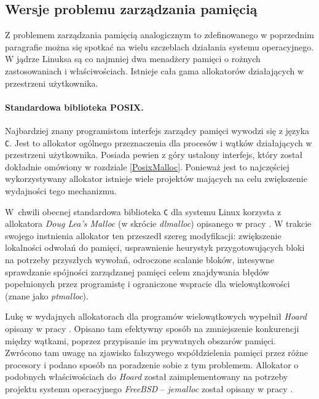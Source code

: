 \documentclass[12pt,a4paper,titlepage,twoside]{mwart}
\begin{document}
\subsection{Wersje problemu zarządzania pamięcią}

Z problemem zarządzania pamięcią analogicznym to zdefinowanego w poprzednim
paragrafie można się spotkać na wielu szczeblach działania systemu
operacyjnego. W jądrze Linuksa są co najmniej dwa menadżery pamięci o rożnych
zastosowaniach i właściwościach. Istnieje cała gama allokatorów działających w
przestrzeni użytkownika.

\paragraph{Standardowa biblioteka POSIX.}

Najbardziej znany programistom interfejs zarządcy pamięci wywodzi się z języka
\verb+C+. Jest to allokator ogólnego przeznaczenia dla procesów i wątków
działających w przestrzeni użytkownika. Posiada pewien z góry ustalony
interfejs, który został dokładnie omówiony w rozdziale \ref{PosixMalloc}.
Ponieważ jest to najczęściej wykorzystywany allokator istnieje wiele projektów
mających na celu zwiększenie wydajności tego mechanizmu.

W~chwili obecnej standardowa biblioteka \verb+C+ dla systemu Linux korzysta z
allokatora \textit{Doug Lea's Malloc} (w skrócie \textit{dlmalloc}) opisanego w
pracy \cite{douglea96malloc}. W trakcie swojego instnienia allokator ten
przeszedł szereg modyfikacji: zwiększenie lokalności odwołań do pamięci,
usprawnienie heurystyk przygotowujących bloki na potrzeby przyszłych wywołań,
odroczone scalanie bloków, intesywne sprawdzanie spójności zarządzanej pamięci
celem znajdywania błędów popełnionych przez programistę i ograniczone wspracie
dla wielowątkowości (znane jako \textit{ptmalloc}).

Lukę w wydajnych allokatorach dla programów wielowątkowych wypełnił
\textit{Hoard} opisany w pracy \cite{berger00hoard}. Opisano tam efektywny
sposób na zmniejszenie konkurencji między wątkami, poprzez przypisanie im
prywatnych obszarów pamięci. Zwrócono tam uwagę na zjawisko fałszywego
współdzielenia pamięci przez różne procesory i podano sposób na poradzenie
sobie z tym problemem. Allokator o podobnych właściwościach do \textit{Hoard}
został zaimplementowany na potrzeby projektu systemu operacyjnego
\textit{FreeBSD} -- \textit{jemalloc} został opisany w pracy
\cite{evans06scalable}.
\end{document}
